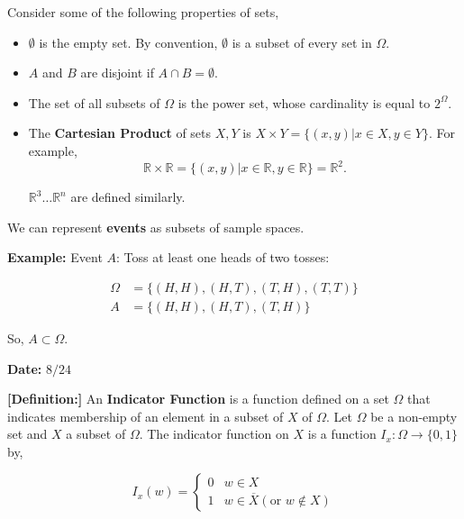 \documentclass[12pt]{article}
\newcommand{\R}{\mathbb{R}}
\begin{document}
\noindent
Consider some of the following properties of sets,
\begin{itemize}
\item $\emptyset$ is the empty set. By convention, $\emptyset$ is a subset of every set in $\Omega$.
\item $A$ and $B$ are disjoint if $A \cap B = \emptyset$.
\item The set of all subsets of $\Omega$ is the power set, whose cardinality is equal to $2^{\Omega}$.
\item The \textbf{Cartesian Product} of sets $X,Y$ is $X \times Y = \big \{ (x,y) | x \in X, y \in Y \big \}$. For example, 
\begin{equation*}
\R \times \R = \big \{ (x, y) | x \in \R, y \in \R \big \} = \R^2.
\end{equation*}

\noindent
$\R^3 \ldots \R^n$ are defined similarly. 
\end{itemize}

\noindent
We can represent \textbf{events} as subsets of sample spaces.

\begin{tcolorbox}
\textbf{Example:} Event $A$: Toss at least one heads of two tosses:

\begin{align*}
\Omega & = \big \{ (H,H), (H,T), (T,H), (T,T) \big \} \\
A & = \big \{ (H,H), (H,T), (T,H) \big \}
\end{align*}

\noindent
So, $A \subset \Omega$.
\end{tcolorbox}


\begin{flushright}
\textbf{Date:} $8/24$ 
\end{flushright}


\noindent
\textbf{[Definition:]} An \textbf{Indicator Function} is a function defined on a set $\Omega$ that indicates membership of an element in a subset of $X$ of $\Omega$. Let $\Omega$ be a non-empty set and $X$ a subset of $\Omega$. The indicator function on $X$ is a function $I_x : \Omega \rightarrow \{ 0,1 \}$ by,

\begin{equation*}
I_x(w) =  \begin{cases} 
      0 & w \in X \\
      1 & w \in \overline{X} (\text{or } w \not \in X)
   \end{cases}
\end{equation*}
\end{document}
